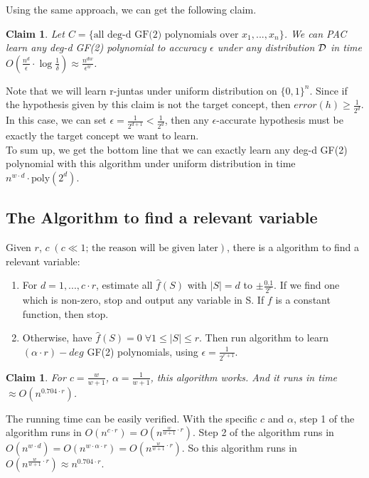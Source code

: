 \documentclass[12pt]{article}
\newtheorem{claim}[theorem]{Claim}
\newcommand{\cald}{{\cal D}}
\newcommand{\poly}{\mathrm{poly}}
\begin{document}
Using the same approach, we can get the following claim.

\begin{claim}
Let $C = \{ \text{all deg-d GF(2) polynomials over } x_1,...,x_n
\}$. We can PAC learn any deg-d GF(2) polynomial to accuracy
$\epsilon$ under any distribution $\cald$ in time $O(\frac
{n^d}{\epsilon} \cdot \log {\frac {1}{\delta}}) \approx \frac
{n^{dw}}{\epsilon^w}$.
\end{claim}

Note that we will learn r-juntas under uniform distribution on $\{ 0,1
\}^n$. Since if the hypothesis given by this claim is not the target
concept, then $error(h) \ge \frac {1}{2^d}$. In this case, we can set
$\epsilon  = \frac {1}{2^{d+1}} < \frac {1}{2^d}$, then any
$\epsilon$-accurate hypothesis must be exactly the target concept we
want to learn. \\

To sum up, we get the bottom line that we can exactly learn any deg-d
GF(2) polynomial with this algorithm under uniform distribution in
time $n^{w \cdot d} \cdot \poly (2^d)$.

\subsection{The Algorithm to find a relevant variable}

Given $r$, $c \; (c \ll 1 \text{; the reason will be given later})$,
there is a algorithm to find a relevant variable:

\begin{enumerate}
\item For $d = 1,..., c \cdot r$, estimate all $\hat {f}(S)$ with $|S|
  = d$ to $\pm \frac {0.1}{2^r}$. If we find one which is non-zero,
  stop and output any variable in S. If $f$ is a constant function,
  then stop.
\item Otherwise, have $\hat {f}(S) = 0 \; \forall 1 \le |S| \le
  r$. Then run algorithm to learn $(\alpha \cdot r)-deg$ GF(2)
  polynomials, using $\epsilon = \frac {1}{2^{r+1}}$.
\end{enumerate}

\begin{claim}
For $c = \frac {w}{w+1}$, $\alpha = \frac {1}{w+1}$, this algorithm
works. And it runs in time $\approx O(n^{0.704 \cdot r})$.
\end{claim}

The running time can be easily verified. With the specific $c$ and
$\alpha$, step 1 of the algorithm runs in $O(n^{c \cdot r}) =
O(n^{\frac {w}{w+1} \cdot r})$. Step 2 of the algorithm runs in
$O(n^{w \cdot d}) = O(n^{w \cdot \alpha \cdot r}) = O(n^{\frac
  {w}{w+1} \cdot r})$. So this algorithm runs in $O(n^{\frac {w}{w+1}
  \cdot r}) \approx n^{0.704 \cdot r}$. \\
\end{document}
